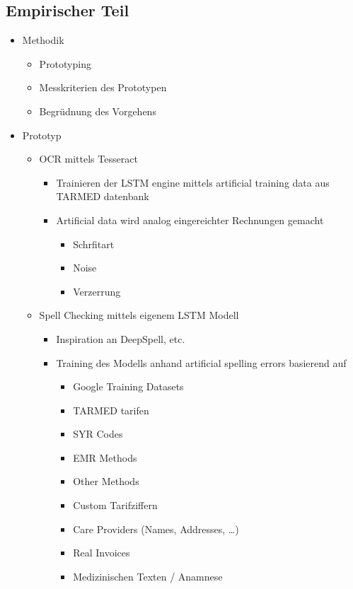 \documentclass[12pt, twoside, table]{extarticle}
\begin{document}
\subsection{Empirischer Teil}
\begin{itemize}
    \item Methodik
    \begin{itemize}
		\item Prototyping
		\item Messkriterien des Prototypen
		\item Begrüdnung des Vorgehens
    \end{itemize}
	\item Prototyp
    \begin{itemize}
		\item OCR mittels Tesseract
        \begin{itemize}
			\item Trainieren der LSTM engine mittels artificial training data aus TARMED datenbank
			\item Artificial data wird analog eingereichter Rechnungen gemacht
            \begin{itemize}
				\item Schrfitart
				\item Noise
				\item Verzerrung
            \end{itemize}
        \end{itemize}
	    \item Spell Checking mittels eigenem LSTM Modell
        \begin{itemize}
		    \item Inspiration an DeepSpell, etc.
		    \item Training des Modells anhand artificial spelling errors basierend auf
            \begin{itemize}
				\item Google Training Datasets
				\item TARMED tarifen
				\item SYR Codes
				\item EMR Methods
				\item Other Methods
				\item Custom Tarifziffern
				\item Care Providers (Names, Addresses, …)
				\item Real Invoices
				\item Medizinischen Texten / Anamnese
            \end{itemize}

\end{itemize}
\end{itemize}
\end{itemize}
\end{document}
